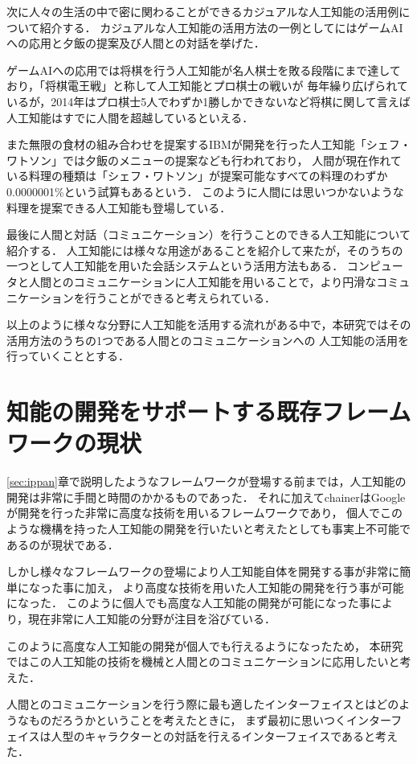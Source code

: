 次に人々の生活の中で密に関わることができるカジュアルな人工知能の活用例について紹介する．
カジュアルな人工知能の活用方法の一例としてにはゲームAIへの応用と夕飯の提案及び人間との対話を挙げた．

ゲームAIへの応用では将棋を行う人工知能が名人棋士を敗る段階にまで達しており，「将棋電王戦」と称して人工知能とプロ棋士の戦いが
毎年繰り広げられているが，2014年はプロ棋士5人でわずか1勝しかできないなど将棋に関して言えば人工知能はすでに人間を超越しているといえる．

また無限の食材の組み合わせを提案するIBMが開発を行った人工知能「シェフ・ワトソン」では夕飯のメニューの提案なども行われており，
人間が現在作れている料理の種類は「シェフ・ワトソン」が提案可能なすべての料理のわずか0.0000001\%という試算もあるという．
このように人間には思いつかないような料理を提案できる人工知能も登場している．

最後に人間と対話（コミュニケーション）を行うことのできる人工知能について紹介する．
人工知能には様々な用途があることを紹介して来たが，そのうちの一つとして人工知能を用いた会話システムという活用方法もある．
コンピュータと人間とのコミュニケーションに人工知能を用いることで，より円滑なコミュニケーションを行うことができると考えられている．

以上のように様々な分野に人工知能を活用する流れがある中で，本研究ではその活用方法のうちの1つである人間とのコミュニケーションへの
人工知能の活用を行っていくこととする．

\section{知能の開発をサポートする既存フレームワークの現状}
\ref{sec:ippan}章で説明したようなフレームワークが登場する前までは，人工知能の開発は非常に手間と時間のかかるものであった．
それに加えてchainerはGoogleが開発を行った非常に高度な技術を用いるフレームワークであり，
個人でこのような機構を持った人工知能の開発を行いたいと考えたとしても事実上不可能であるのが現状である．

しかし様々なフレームワークの登場により人工知能自体を開発する事が非常に簡単になった事に加え，
より高度な技術を用いた人工知能の開発を行う事が可能になった．
このように個人でも高度な人工知能の開発が可能になった事により，現在非常に人工知能の分野が注目を浴びている．

このように高度な人工知能の開発が個人でも行えるようになったため，
本研究ではこの人工知能の技術を機械と人間とのコミュニケーションに応用したいと考えた．

人間とのコミュニケーションを行う際に最も適したインターフェイスとはどのようなものだろうかということを考えたときに，
まず最初に思いつくインターフェイスは人型のキャラクターとの対話を行えるインターフェイスであると考えた．

